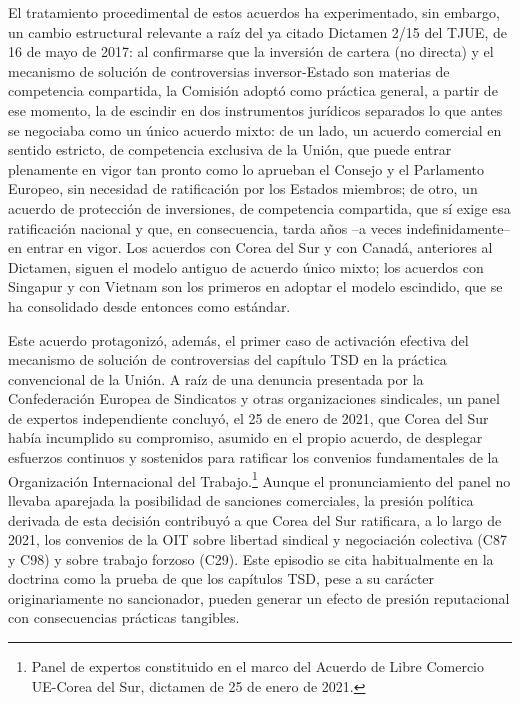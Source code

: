 \documentclass[10pt,a4paper]{article}
\begin{document}
El tratamiento procedimental de estos acuerdos ha experimentado, sin embargo, un cambio estructural relevante a raíz del ya citado Dictamen 2/15 del TJUE, de 16 de mayo de 2017: al confirmarse que la inversión de cartera (no directa) y el mecanismo de solución de controversias inversor-Estado son materias de competencia compartida, la Comisión adoptó como práctica general, a partir de ese momento, la de escindir en dos instrumentos jurídicos separados lo que antes se negociaba como un único acuerdo mixto: de un lado, un acuerdo comercial en sentido estricto, de competencia exclusiva de la Unión, que puede entrar plenamente en vigor tan pronto como lo aprueban el Consejo y el Parlamento Europeo, sin necesidad de ratificación por los Estados miembros; de otro, un acuerdo de protección de inversiones, de competencia compartida, que sí exige esa ratificación nacional y que, en consecuencia, tarda años --a veces indefinidamente-- en entrar en vigor. Los acuerdos con Corea del Sur y con Canadá, anteriores al Dictamen, siguen el modelo antiguo de acuerdo único mixto; los acuerdos con Singapur y con Vietnam son los primeros en adoptar el modelo escindido, que se ha consolidado desde entonces como estándar.

Este acuerdo protagonizó, además, el primer caso de activación efectiva del mecanismo de solución de controversias del capítulo TSD en la práctica convencional de la Unión. A raíz de una denuncia presentada por la Confederación Europea de Sindicatos y otras organizaciones sindicales, un panel de expertos independiente concluyó, el 25 de enero de 2021, que Corea del Sur había incumplido su compromiso, asumido en el propio acuerdo, de desplegar esfuerzos continuos y sostenidos para ratificar los convenios fundamentales de la Organización Internacional del Trabajo.\footnote{%
    Panel de expertos constituido en el marco del Acuerdo de Libre Comercio UE-Corea del Sur, dictamen de 25 de enero de 2021.
} Aunque el pronunciamiento del panel no llevaba aparejada la posibilidad de sanciones comerciales, la presión política derivada de esta decisión contribuyó a que Corea del Sur ratificara, a lo largo de 2021, los convenios de la OIT sobre libertad sindical y negociación colectiva (C87 y C98) y sobre trabajo forzoso (C29). Este episodio se cita habitualmente en la doctrina como la prueba de que los capítulos TSD, pese a su carácter originariamente no sancionador, pueden generar un efecto de presión reputacional con consecuencias prácticas tangibles.
\end{document}
